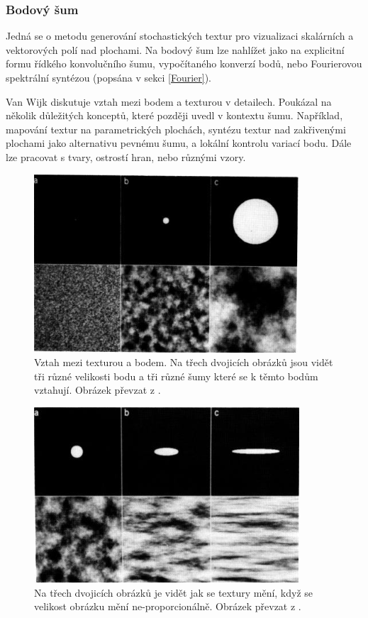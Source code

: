 \subsubsection{Bodový šum}
\label{SpotNoise}
Jedná se o metodu generování stochastických textur pro vizualizaci skalárních a vektorových polí nad plochami. Na bodový šum lze nahlížet jako na explicitní formu řídkého konvolučního šumu, vypočítaného konverzí bodů, nebo Fourierovou spektrální syntézou (popsána v sekci \ref{Fourier}).

Van Wijk \cite{Wijk91} diskutuje vztah mezi bodem a texturou v detailech. Poukázal na několik důležitých konceptů, které později uvedl v kontextu šumu. Například, mapování textur na parametrických plochách, syntézu textur nad zakřivenými plochami jako alternativu pevnému šumu, a lokální kontrolu variací bodu. Dále lze pracovat s tvary, ostrostí hran, nebo různými vzory.

\begin{figure}[H]
	\centering
	\includegraphics[scale=0.7]{obrazky-figures/SpotNoiseSize.png}
	\caption{Vztah mezi texturou a bodem. Na třech dvojicích obrázků jsou vidět tři různé velikosti bodu a tři různé šumy které se k těmto bodům vztahují. Obrázek převzat z \cite{Wijk91}.}
	\label{fig:SpotNoise}
\end{figure}
\begin{figure}[H]
	\centering
	\includegraphics[scale=0.7]{obrazky-figures/SpotNoiseNonProportional.png}
	\caption{Na třech dvojicích obrázků je vidět jak se textury mění, když se velikost obrázku mění ne-proporcionálně. Obrázek převzat z \cite{Wijk91}.}
	\label{fig:SpotNoiseNonProportional}
\end{figure}

